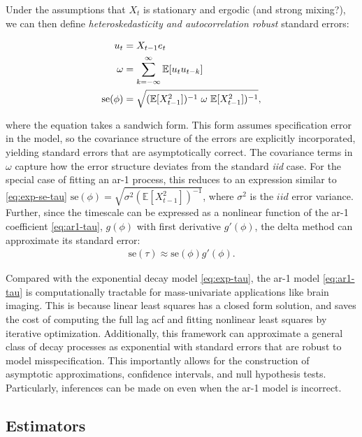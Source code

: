 \documentclass[main.tex]{subfiles}
\begin{document}
Under the assumptions that $X_t$ is stationary and ergodic (and strong mixing?), we can then define \textit{heteroskedasticity and autocorrelation robust} standard errors:

\begin{align}
    u_t &= X_{t-1} e_t \notag\\
    \omega &= \sum_{k=-\infty}^{\infty} \mathbb{E}[u_t u_{t-k}] \notag\\
    \text{se}(\phi) &= \sqrt{(\mathbb{E}[X_{t-1}^2])^{-1} \hspace{3px} \omega \hspace{3px} \mathbb{E}[X_{t-1}^2])^{-1}}, \label{eq:se-phi}
\end{align}

where the equation takes a sandwich form. This form assumes specification error in the model, so the covariance structure of the errors are explicitly incorporated, yielding standard errors that are asymptotically correct. The covariance terms in $\omega$ capture how the error structure deviates from the standard \textit{iid} case. For the special case of fitting an ar-1 process, this reduces to an expression similar to \eqref{eq:exp-se-tau} $\text{se}(\phi) = \sqrt{\sigma^2 (\mathbb{E}[X_{t-1}^2])^{-1}}$, where $\sigma^2$ is the $iid$ error variance. \\

Further, since the timescale can be expressed as a nonlinear function of the ar-1 coefficient \eqref{eq:ar1-tau}, $g(\phi)$ with first derivative $g'(\phi)$, the delta method can approximate its standard error:
\begin{align}
    \text{se}(\tau) \approx \text{se}(\phi) g'(\phi) \label{se-tau}.
\end{align}

Compared with the exponential decay model \eqref{eq:exp-tau}, the ar-1 model \eqref{eq:ar1-tau} is computationally tractable for mass-univariate applications like brain imaging. This is because linear least squares has a closed form solution, and saves the cost of computing the full lag acf and fitting nonlinear least squares by iterative optimization. Additionally, this framework can approximate a general class of decay processes as exponential with standard errors that are robust to model misspecification. This importantly allows for the construction of asymptotic approximations, confidence intervals, and null hypothesis tests. Particularly, inferences can be made on even when the ar-1 model is incorrect.

\subsection{Estimators}
\end{document}
